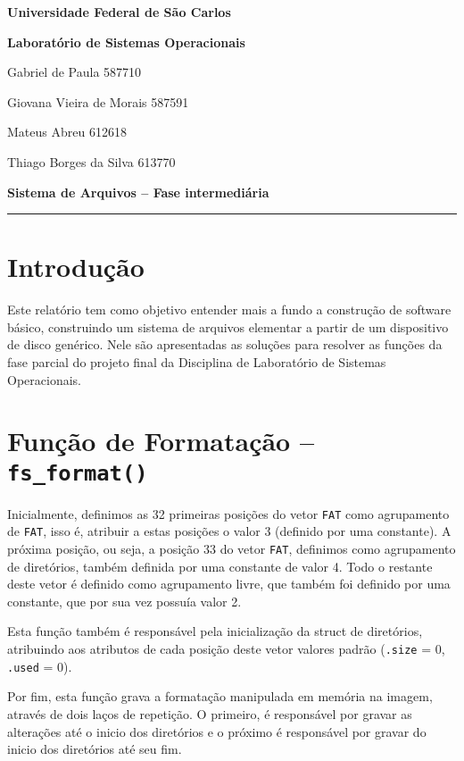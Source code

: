 \documentclass[11pt]{article}
\begin{document}
\begin{center}\Large{\textbf{Universidade Federal de São Carlos}}\end{center}
\begin{center}\Large{\textbf{Laboratório de Sistemas Operacionais}}\end{center}
\vspace{0.5cm}
\noindent Gabriel de Paula \hfill 587710

\noindent Giovana Vieira de Morais \hfill 587591

\noindent Mateus Abreu \hfill 612618

\noindent Thiago Borges da Silva \hfill 613770

\vspace{0.5cm}

\noindent \begin{center}\Large{\textbf{Sistema de Arquivos -- Fase intermediária}}\end{center}

\noindent \rule{\linewidth}{1.5pt}

\section{Introdução}
Este relatório tem como objetivo entender mais a fundo a construção de software básico, construindo um sistema de arquivos elementar a partir de um dispositivo de disco genérico. Nele são apresentadas as soluções para resolver as funções da fase parcial do projeto final da Disciplina de Laboratório de Sistemas Operacionais.

\section{Função de Formatação -- \texttt{fs\_format()}}
\par
Inicialmente, definimos as 32 primeiras posições do vetor \texttt{FAT} como agrupamento de \texttt{FAT}, isso é, atribuir a estas posições o valor 3 (definido por uma constante). A próxima posição, ou seja, a posição 33 do vetor \texttt{FAT}, definimos como agrupamento de diretórios, também definida por uma constante de valor 4. Todo o restante deste vetor é definido como agrupamento livre, que também foi definido por uma constante, que por sua vez possuía valor 2.
\par
Esta função também é responsável pela inicialização da struct de diretórios, atribuindo aos  atributos de cada posição deste vetor valores padrão (\texttt{.size} = 0, \texttt{.used} = 0).
\par
Por fim, esta função grava a formatação manipulada em memória na imagem, através de dois laços de repetição. O primeiro, é responsável por gravar as alterações até o inicio dos diretórios e o próximo é responsável por gravar do inicio dos diretórios até seu fim.
\end{document}
